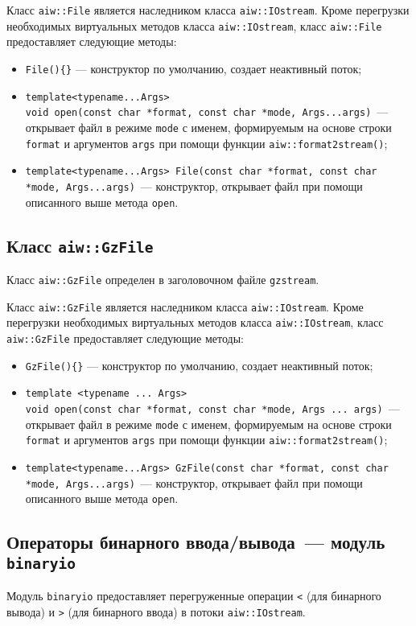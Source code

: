 Класс \verb'aiw::File' является наследником класса \verb'aiw::IOstream'. Кроме перегрузки необходимых
виртуальных методов класса \verb'aiw::IOstream', класс \verb'aiw::File' предоставляет следующие методы:
\begin{itemize}
\item \verb'File(){}' --- конструктор по умолчанию, создает неактивный поток;
\item \verb'template<typename...Args>'\\\verb'void open(const char *format, const char *mode, Args...args)'~---
  открывает файл в режиме \verb'mode' с именем, формируемым на основе строки \verb'format' и аргументов \verb'args'
  при помощи функции  \verb'aiw::format2stream()';
\item \verb'template<typename...Args> File(const char *format, const char *mode, Args...args)'~---
  конструктор, открывает файл при помощи описанного выше метода \verb'open'.
\end{itemize}

\subsection{Класс {\tt aiw::GzFile}}
Класс \verb'aiw::GzFile' определен в заголовочном файле \verb'gzstream'.

Класс \verb'aiw::GzFile' является наследником класса \verb'aiw::IOstream'. Кроме перегрузки необходимых
виртуальных методов класса \verb'aiw::IOstream', класс \verb'aiw::GzFile' предоставляет следующие методы:
\begin{itemize}
\item \verb'GzFile(){}' --- конструктор по умолчанию, создает неактивный поток;
\item \verb'template <typename ... Args>'\\\verb'void open(const char *format, const char *mode, Args ... args)'~---
  открывает файл в режиме \verb'mode' с именем, формируемым на основе строки \verb'format' и аргументов \verb'args'
  при помощи функции  \verb'aiw::format2stream()';
\item \verb'template<typename...Args> GzFile(const char *format, const char *mode, Args...args)'~---
  конструктор, открывает файл при помощи описанного выше метода \verb'open'.
\end{itemize}

\subsection{Операторы бинарного ввода/вывода~--- модуль {\tt binaryio}}
Модуль \verb'binaryio' предоставляет перегруженные операции \verb'<' (для бинарного вывода) и \verb'>' (для бинарного ввода)
в потоки \verb'aiw::IOstream'.

